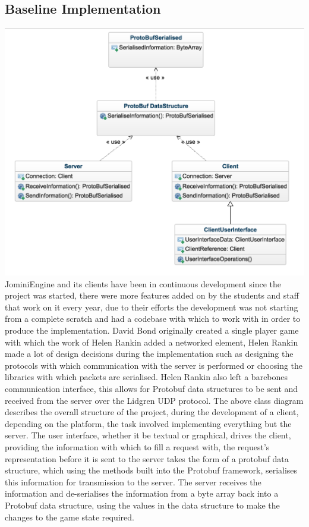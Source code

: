 \documentclass{article}
\begin{document}
\subsection{Baseline Implementation}
\includegraphics[width=\textwidth]{classdiagram.png}
JominiEngine and its clients have been in continuous development since the project was started, there were more features added on by the students and staff that work on it every year, due to their efforts the development was not starting from a complete scratch and had a codebase with which to work with in order to produce the implementation. David Bond\cite{DavidBond} originally created a single player game with which the work of Helen Rankin\cite{helenrankin} added a networked element, Helen Rankin made a lot of design decisions during the implementation such as designing the protocols with which communication with the server is performed or choosing the libraries with which packets are serialised. Helen Rankin also left a barebones communication interface, this allows for Protobuf data structures to be sent and received from the server over the Lidgren UDP protocol. The above class diagram describes the overall structure of the project, during the development of a client, depending on the platform, the task involved implementing everything but the server. The user interface, whether it be textual or graphical, drives the client, providing the information with which to fill a request with, the request's representation before it is sent to the server takes the form of a protobuf data structure, which using the methods built into the Protobuf framework, serialises this information for transmission to the server. The server receives the information and de-serialises the information from a byte array back into a Protobuf data structure, using the values in the data structure to make the changes to the game state required.
\end{document}
